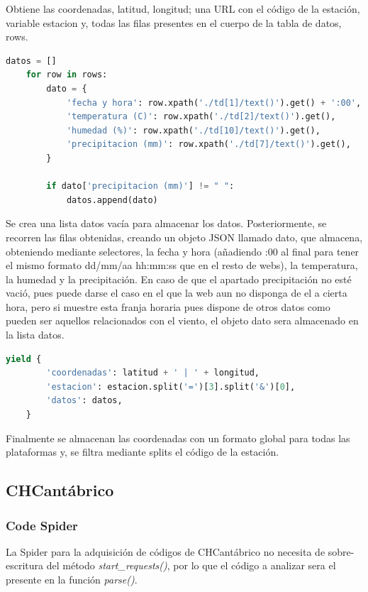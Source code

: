 Obtiene las coordenadas, latitud, longitud; una URL con el código de la estación, variable estacion y, todas las filas presentes en el cuerpo de la tabla de datos, rows.

\begin{lstlisting}[language=Python, caption={Trabajar sobre los datos de Aemet Data Spider}]
	datos = []
	for row in rows:
		dato = {
			'fecha y hora': row.xpath('./td[1]/text()').get() + ':00',
			'temperatura (C)': row.xpath('./td[2]/text()').get(),
			'humedad (%)': row.xpath('./td[10]/text()').get(),
			'precipitacion (mm)': row.xpath('./td[7]/text()').get(),
		}
		
		if dato['precipitacion (mm)'] != " ":
			datos.append(dato)
\end{lstlisting}

Se crea una lista datos vacía para almacenar los datos. Posteriormente, se recorren las filas obtenidas, creando un objeto JSON llamado dato, que almacena, obteniendo mediante selectores, la fecha y hora (añadiendo :00 al final para tener el mismo formato dd/mm/aa hh:mm:ss que en el resto de webs), la temperatura, la humedad y la precipitación.\newline
\newline
En caso de que el apartado precipitación no esté vació, pues puede darse el caso en el que la web aun no disponga de el a cierta hora, pero si muestre esta franja horaria pues dispone de otros datos como pueden ser aquellos relacionados con el viento, el objeto dato sera almacenado en la lista datos.

\begin{lstlisting}[language=Python, caption={Guardado de datos de Aemet Data Spider}]
	yield {
		'coordenadas': latitud + ' | ' + longitud,
		'estacion': estacion.split('=')[3].split('&')[0],
		'datos': datos,
	}
\end{lstlisting}

Finalmente se almacenan las coordenadas con un formato global para todas las plataformas y, se filtra mediante splits el código de la estación.

\subsection{CHCantábrico}

\subsubsection{Code Spider}
La Spider para la adquisición de códigos de CHCantábrico no necesita de sobre-escritura del método \textit{start\_requests()}, por lo que el código a analizar sera el presente en la función \textit{parse()}.

